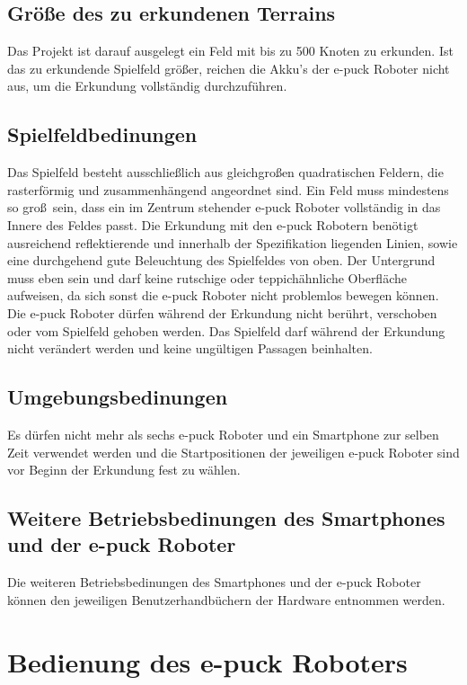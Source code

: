 \documentclass[10pt,a4paper]{article}
\let\oldsection\section
\renewcommand{\section}{\newpage \oldsection}
\begin{document}
		\subsection{ Gr\"o\ss e des zu erkundenen Terrains} 
				Das Projekt ist darauf ausgelegt ein Feld mit bis zu 500 Knoten zu erkunden. Ist das zu erkundende Spielfeld gr\"o\ss er, reichen die Akku's der e-puck Roboter
				nicht aus, um die Erkundung vollst\"andig durchzuf\"uhren.
		\subsection{ Spielfeldbedinungen} 
				Das Spielfeld besteht ausschlie\ss lich aus gleichgro\ss en quadratischen Feldern, die rasterf\"ormig und zusammenh\"angend angeordnet sind. Ein Feld 
				muss mindestens so gro\ss \ sein, dass ein im Zentrum stehender e-puck Roboter vollst\"andig in das Innere des Feldes passt. Die Erkundung mit den e-puck 
				Robotern ben\"otigt ausreichend reflektierende und innerhalb der Spezifikation liegenden Linien, sowie eine durchgehend gute Beleuchtung des Spielfeldes 
				von oben. Der Untergrund muss eben sein und darf keine rutschige oder teppich\"ahnliche Oberfl\"ache aufweisen, da sich sonst die e-puck Roboter nicht 
				problemlos bewegen k\"onnen. Die e-puck Roboter d\"urfen w\"ahrend der Erkundung nicht ber\"uhrt, verschoben oder vom Spielfeld gehoben werden. Das 
				Spielfeld darf w\"ahrend der Erkundung nicht ver\"andert werden und keine ung\"ultigen Passagen beinhalten. 
		\subsection{ Umgebungsbedinungen} 
				Es d\"urfen nicht mehr als sechs e-puck Roboter und ein Smartphone zur selben Zeit verwendet werden und die Startpositionen der jeweiligen e-puck Roboter
				sind vor Beginn der Erkundung fest zu w\"ahlen.
		\subsection{ Weitere Betriebsbedinungen des Smartphones und der e-puck Roboter} 
				Die weiteren Betriebsbedinungen des Smartphones und der e-puck Roboter k\"onnen den jeweiligen Benutzerhandb\"uchern der Hardware entnommen 
				werden.
\section{Bedienung des e-puck Roboters}
	\label{e_puck_bedienung}
\end{document}
